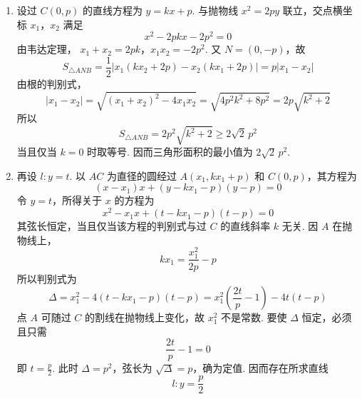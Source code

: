 \begin{solution}
\begin{enumerate}
\item
设过 \(C(0,p)\) 的直线方程为 \(y=kx+p\). 与抛物线 \(x^2=2py\) 联立，交点横坐标 \(x_1\)，\(x_2\) 满足
\[
x^2-2pkx-2p^2=0
\]
由韦达定理，
\(x_1+x_2=2pk\)，\(x_1x_2=-2p^2\).
又 \(N=(0,-p)\)，故
\[
S_{\triangle ANB}
=\frac12\left|x_1(kx_2+2p)-x_2(kx_1+2p)\right|
=p|x_1-x_2|
\]
由根的判别式，
\[
|x_1-x_2|
=\sqrt{(x_1+x_2)^2-4x_1x_2}
=\sqrt{4p^2k^2+8p^2}
=2p\sqrt{k^2+2}
\]
所以
\[
S_{\triangle ANB}=2p^2\sqrt{k^2+2}\geqslant2\sqrt2\,p^2
\]
当且仅当 \(k=0\) 时取等号. 因而三角形面积的最小值为 \(2\sqrt2\,p^2\).

\item
再设 \(l:y=t\). 以 \(AC\) 为直径的圆经过 \(A(x_1,kx_1+p)\) 和 \(C(0,p)\)，其方程为
\[
(x-x_1)x+(y-kx_1-p)(y-p)=0
\]
令 \(y=t\)，所得关于 \(x\) 的方程为
\[
x^2-x_1x+(t-kx_1-p)(t-p)=0
\]
其弦长恒定，当且仅当该方程的判别式与过 \(C\) 的直线斜率 \(k\) 无关. 因 \(A\) 在抛物线上，
\[
kx_1=\frac{x_1^2}{2p}-p
\]
所以判别式为
\[
\Delta=x_1^2-4(t-kx_1-p)(t-p)
=x_1^2\left(\frac{2t}{p}-1\right)-4t(t-p)
\]
点 \(A\) 可随过 \(C\) 的割线在抛物线上变化，故 \(x_1^2\) 不是常数. 要使 \(\Delta\) 恒定，必须且只需
\[
\frac{2t}{p}-1=0
\]
即 \(t=\frac p2\). 此时 \(\Delta=p^2\)，弦长为 \(\sqrt{\Delta}=p\)，确为定值. 因而存在所求直线
\[
l:y=\frac p2
\]
\end{enumerate}
\end{solution}
